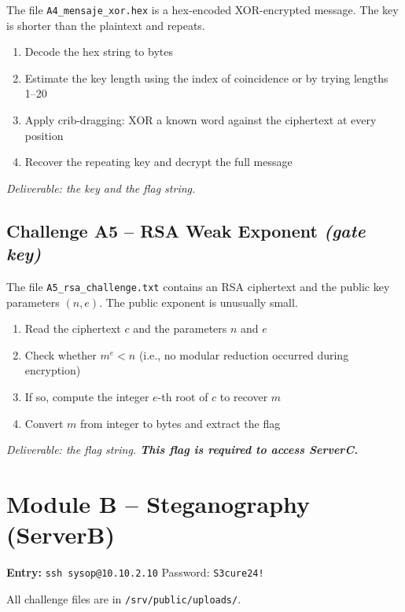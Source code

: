 \documentclass[a4paper, 12pt]{article}
\begin{document}
The file \texttt{A4\_mensaje\_xor.hex} is a hex-encoded XOR-encrypted message.
The key is shorter than the plaintext and repeats.

\begin{enumerate}[leftmargin=2em]
  \item Decode the hex string to bytes
  \item Estimate the key length using the index of coincidence or by trying lengths 1--20
  \item Apply crib-dragging: XOR a known word against the ciphertext at every position
  \item Recover the repeating key and decrypt the full message
\end{enumerate}

\textit{Deliverable: the key and the flag string.}

\subsection{Challenge A5 -- RSA Weak Exponent \emph{(gate key)}}

The file \texttt{A5\_rsa\_challenge.txt} contains an RSA ciphertext and the public
key parameters $(n, e)$. The public exponent is unusually small.

\begin{enumerate}[leftmargin=2em]
  \item Read the ciphertext $c$ and the parameters $n$ and $e$
  \item Check whether $m^e < n$ (i.e., no modular reduction occurred during encryption)
  \item If so, compute the integer $e$-th root of $c$ to recover $m$
  \item Convert $m$ from integer to bytes and extract the flag
\end{enumerate}

\textit{Deliverable: the flag string. \textbf{This flag is required to access ServerC.}}

\section{Module B -- Steganography (ServerB)}

\textbf{Entry:} \texttt{ssh sysop@10.10.2.10} \quad Password: \texttt{S3cure24!}

All challenge files are in \texttt{/srv/public/uploads/}.
\end{document}
